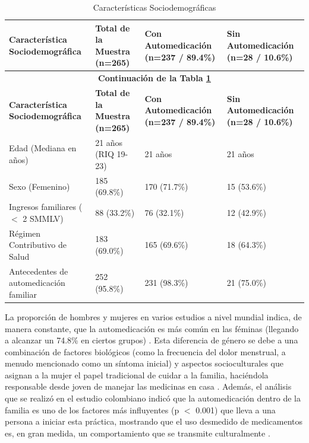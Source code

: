 \begin{longtable}{m{} m{} m{} m{}}
 \caption{Características Sociodemográficas}
  \label{tab:sociodemografica}\\
\hline
\textbf{Característica Sociodemográfica} & 
\textbf{Total de la Muestra \newline (n=265)} & 
\textbf{Con Automedicación \newline (n=237 / 89.4\%)} & 
\textbf{Sin Automedicación \newline (n=28 / 10.6\%)} \\
\hline
\endfirsthead

\multicolumn{4}{c}{\textbf{Continuación de la Tabla \ref{tab:sociodemografica}}}\\
\hline
\textbf{Característica Sociodemográfica} & 
\textbf{Total de la Muestra \newline (n=265)} & 
\textbf{Con Automedicación \newline (n=237 / 89.4\%)} & 
\textbf{Sin Automedicación \newline (n=28 / 10.6\%)} \\
\hline
\endhead
\hline
\endlastfoot

Edad (Mediana en años) & 
21 años (RIQ 19-23) & 
21 años & 
21 años \\
\midrule
Sexo (Femenino) & 
185 (69.8\%) & 
170 (71.7\%) & 
15 (53.6\%) \\
\midrule
Ingresos familiares ($<$ 2 SMMLV) & 
88 (33.2\%) & 
76 (32.1\%) & 
12 (42.9\%) \\
\midrule
Régimen Contributivo de Salud & 
183 (69.0\%) & 
165 (69.6\%) & 
18 (64.3\%) \\
\midrule
Antecedentes de automedicación familiar & 
252 (95.8\%) & 
231 (98.3\%) & 
21 (75.0\%) \\
\bottomrule
\end{longtable}

La proporción de hombres y mujeres en varios estudios a nivel mundial indica, de manera constante, que la automedicación es más común en las féminas (llegando a alcanzar un 74.8\% en ciertos grupos) \cite{gacetaunam2023automedicacion}. Esta diferencia de género se debe a una combinación de factores biológicos (como la frecuencia del dolor menstrual, a menudo mencionado como un síntoma inicial) y aspectos socioculturales que asignan a la mujer el papel tradicional de cuidar a la familia, haciéndola responsable desde joven de manejar las medicinas en casa \cite{aveiga2021complicaciones}. Además, el análisis que se realizó en el estudio colombiano indicó que la automedicación dentro de la familia es uno de los factores más influyentes (p $<$ 0.001) que lleva a una persona a iniciar esta práctica, mostrando que el uso desmedido de medicamentos es, en gran medida, un comportamiento que se transmite culturalmente \cite{aveiga2021complicaciones}.

